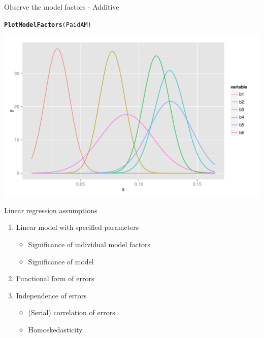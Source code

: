 \documentclass[xcolor=dvipsnames]{beamer}\usepackage{graphicx, color}
\makeatletter
\def\maxwidth{ %
  \ifdim\Gin@nat@width>\linewidth
    \linewidth
  \else
    \Gin@nat@width
  \fi
}
\newcommand{\hlfunctioncall}[1]{\textcolor[rgb]{0.501960784313725,0,0.329411764705882}{\textbf{#1}}}%
\newenvironment{kframe}{%
 \def\at@end@of@kframe{}%
 \ifinner\ifhmode%
  \def\at@end@of@kframe{\end{minipage}}%
  \begin{minipage}{\columnwidth}%
 \fi\fi%
 \def\FrameCommand##1{\hskip\@totalleftmargin \hskip-\fboxsep
 \colorbox{shadecolor}{##1}\hskip-\fboxsep
     \hskip-\linewidth \hskip-\@totalleftmargin \hskip\columnwidth}%
 \MakeFramed {\advance\hsize-\width
   \@totalleftmargin\z@ \linewidth\hsize
   \@setminipage}}%
 {\par\unskip\endMakeFramed%
 \at@end@of@kframe}
\newenvironment{knitrout}{}{} %
\makeatother
\begin{document}
\begin{frame}[fragile]{Observe the model factors - Additive}
\begin{knitrout}
\color{fgcolor}\begin{kframe}
\begin{alltt}
\hlfunctioncall{PlotModelFactors}(PaidAM)
\end{alltt}
\end{kframe}
\includegraphics[width=\maxwidth]{figure/PlotModelFactorsAM} 

\end{knitrout}

\end{frame}

\begin{frame}[fragile]{Linear regression assumptions}
  \begin{enumerate}
    \item Linear model with specified parameters
      \begin{itemize}
        \item Significance of individual model factors
        \item \color{blue} Significance of model
      \end{itemize}
    \item Functional form of errors
    \item Independence of errors
      \begin{itemize}
        \item (Serial) correlation of errors
        \item Homoskedasticity
      \end{itemize}
  \end{enumerate}
\end{frame}
\end{document}
